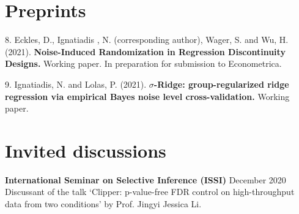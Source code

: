 \documentclass[margin,line]{res}
\newenvironment{list1}{
  \begin{list}{\ding{113}}{%
      \setlength{\itemsep}{0in}
      \setlength{\parsep}{0in} \setlength{\parskip}{0in}
      \setlength{\topsep}{0in} \setlength{\partopsep}{0in}
      \setlength{\leftmargin}{0.17in}}}{\end{list}}
\begin{document}
\begin{resume}
\section{\sc Preprints}
\begin{list1}
\item[8.] Eckles, D., Ignatiadis , N. (corresponding author), Wager, S. and Wu, H. (2021). \textbf{Noise-Induced Randomization in Regression Discontinuity Designs.} Working paper. In preparation for submission to Econometrica.
\item[9.] Ignatiadis, N. and Lolas, P.  (2021). \textbf{$\sigma$-Ridge: group-regularized ridge regression via empirical Bayes noise level cross-validation.} Working paper.
\end{list1}


\section{\sc Invited discussions}
\textbf{International Seminar on Selective Inference (ISSI)} \hfill December 2020\\
Discussant of the talk `Clipper: p-value-free FDR control on high-throughput data from two conditions' 
by Prof. Jingyi Jessica Li.


\end{resume}
\end{document}
